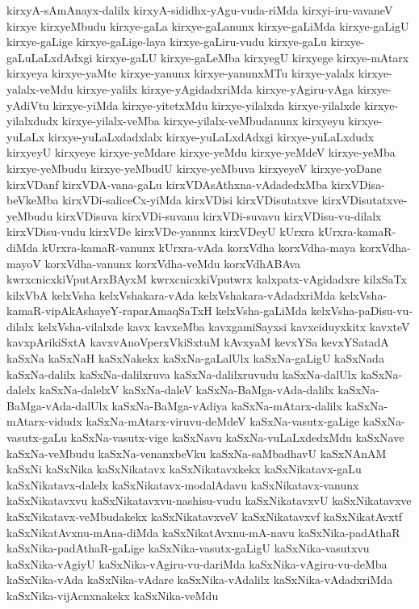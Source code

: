 {kirxyA-sAmAnayx-dalilx
kirxyA-sididhx-yAgu-vuda-riMda
kirxyi-iru-vavaneV
kirxye
kirxyeMbudu
kirxye-gaLa
kirxye-gaLanunx
kirxye-gaLiMda
kirxye-gaLigU
kirxye-gaLige
kirxye-gaLige-laya
kirxye-gaLiru-vudu
kirxye-gaLu
kirxye-gaLuLaLxdAdxgi
kirxye-gaLU
kirxye-gaLeMba
kirxyegU
kirxyege
kirxye-mAtarx
kirxyeya
kirxye-yaMte
kirxye-yanunx
kirxye-yanunxMTu
kirxye-yalalx
kirxye-yalalx-veMdu
kirxye-yalilx
kirxye-yAgidadxriMda
kirxye-yAgiru-vAga
kirxye-yAdiVtu
kirxye-yiMda
kirxye-yitetxMdu
kirxye-yilalxda
kirxye-yilalxde
kirxye-yilalxdudx
kirxye-yilalx-veMba
kirxye-yilalx-veMbudanunx
kirxyeyu
kirxye-yuLaLx
kirxye-yuLaLxdadxlalx
kirxye-yuLaLxdAdxgi
kirxye-yuLaLxdudx
kirxyeyU
kirxyeye
kirxye-yeMdare
kirxye-yeMdu
kirxye-yeMdeV
kirxye-yeMba
kirxye-yeMbudu
kirxye-yeMbudU
kirxye-yeMbuva
kirxyeyeV
kirxye-yoDane
kirxVDanf
kirxVDA-vana-gaLu
kirxVDAsAthxna-vAdadedxMba
kirxVDisa-beVkeMba
kirxVDi-saliceCx-yiMda
kirxVDisi
kirxVDisutatxve
kirxVDisutatxve-yeMbudu
kirxVDisuva
kirxVDi-suvanu
kirxVDi-suvavu
kirxVDisu-vu-dilalx
kirxVDisu-vudu
kirxVDe
kirxVDe-yanunx
kirxVDeyU
kUrxra
kUrxra-kamaR-diMda
kUrxra-kamaR-vanunx
kUrxra-vAda
korxVdha
korxVdha-maya
korxVdha-mayoV
korxVdha-vanunx
korxVdha-veMdu
korxVdhABAva
kwrxcnicxkiVputArxBAyxM
kwrxcnicxkiVputwrx
kalxpatx-vAgidadxre
kilxSaTx
kilxVbA
kelxVsha
kelxVshakara-vAda
kelxVshakara-vAdadxriMda
kelxVsha-kamaR-vipAkAshayeY-raparAmaqSaTxH
kelxVsha-gaLiMda
kelxVsha-paDisu-vu-dilalx
kelxVsha-vilalxde
kavx
kavxeMba
kavxgamiSayxsi
kavxciduyxkitx
kavxteV
kavxpArikiSxtA
kavxvAnoVperxVkiSxtuM
kAvxyaM
kevxYSa
kevxYSatadA
kaSxNa
kaSxNaH
kaSxNakekx
kaSxNa-gaLalUlx
kaSxNa-gaLigU
kaSxNada
kaSxNa-dalilx
kaSxNa-dalilxruva
kaSxNa-dalilxruvudu
kaSxNa-dalUlx
kaSxNa-dalelx
kaSxNa-dalelxV
kaSxNa-daleV
kaSxNa-BaMga-vAda-dalilx
kaSxNa-BaMga-vAda-dalUlx
kaSxNa-BaMga-vAdiya
kaSxNa-mAtarx-dalilx
kaSxNa-mAtarx-vidudx
kaSxNa-mAtarx-viruvu-deMdeV
kaSxNa-vasutx-gaLige
kaSxNa-vasutx-gaLu
kaSxNa-vasutx-vige
kaSxNavu
kaSxNa-vuLaLxdedxMdu
kaSxNave
kaSxNa-veMbudu
kaSxNa-venanxbeVku
kaSxNa-saMbadhavU
kaSxNAnAM
kaSxNi
kaSxNika
kaSxNikatavx
kaSxNikatavxkekx
kaSxNikatavx-gaLu
kaSxNikatavx-dalelx
kaSxNikatavx-modalAdavu
kaSxNikatavx-vanunx
kaSxNikatavxvu
kaSxNikatavxvu-nashisu-vudu
kaSxNikatavxvU
kaSxNikatavxve
kaSxNikatavx-veMbudakekx
kaSxNikatavxveV
kaSxNikatavxvf
kaSxNikatAvxtf
kaSxNikatAvxnu-mAna-diMda
kaSxNikatAvxnu-mA-navu
kaSxNika-padAthaR
kaSxNika-padAthaR-gaLige
kaSxNika-vasutx-gaLigU
kaSxNika-vasutxvu
kaSxNika-vAgiyU
kaSxNika-vAgiru-vu-dariMda
kaSxNika-vAgiru-vu-deMba
kaSxNika-vAda
kaSxNika-vAdare
kaSxNika-vAdalilx
kaSxNika-vAdadxriMda
kaSxNika-vijAcnxnakekx
kaSxNika-veMdu
}
